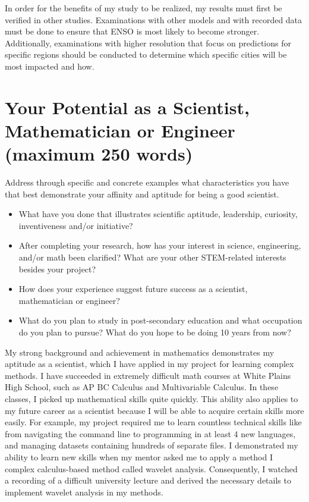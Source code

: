 \documentclass[little]{basic}
\begin{document}
In order for the benefits of my study to be realized, my results must first be verified in other studies. Examinations with other models and with recorded data must be done to ensure that ENSO is most likely to become stronger. Additionally, examinations with higher resolution that focus on predictions for specific regions should be conducted to determine which specific cities will be most impacted and how.


\section{Your Potential as a Scientist, Mathematician or Engineer (maximum 250 words)}
\label{sec:orgd5c249b}
Address through specific and concrete examples what characteristics you have that best demonstrate your affinity and aptitude for being a good scientist.
\begin{itemize}
\item What have you done that illustrates scientific aptitude, leadership, curiosity, inventiveness and/or initiative?
\item After completing your research, how has your interest in science, engineering, and/or math been clarified? What are your other STEM-related interests besides your project?
\item How does your experience suggest future success as a scientist, mathematician or engineer?
\item What do you plan to study in post-secondary education and what occupation do you plan to pursue?  What do you hope to be doing 10 years from now?
\end{itemize}

My strong background and achievement in mathematics demonstrates my aptitude as a scientist, which I have applied in my project for learning complex methods. I have succeeded in extremely difficult math courses at White Plains High School, such as AP BC Calculus and Multivariable Calculus. In these classes, I picked up mathematical skills quite quickly. This ability also applies to my future career as a scientist because I will be able to acquire certain skills more easily. For example, my project required me to learn countless technical skills like from navigating the command line to programming in at least 4 new languages, and managing datasets containing hundreds of separate files. I demonstrated my ability to learn new skills when my mentor asked me to apply a method I complex calculus-based method called wavelet analysis. Consequently, I watched a recording of a difficult university lecture and derived the necessary details to implement wavelet analysis in my methods.
\end{document}
